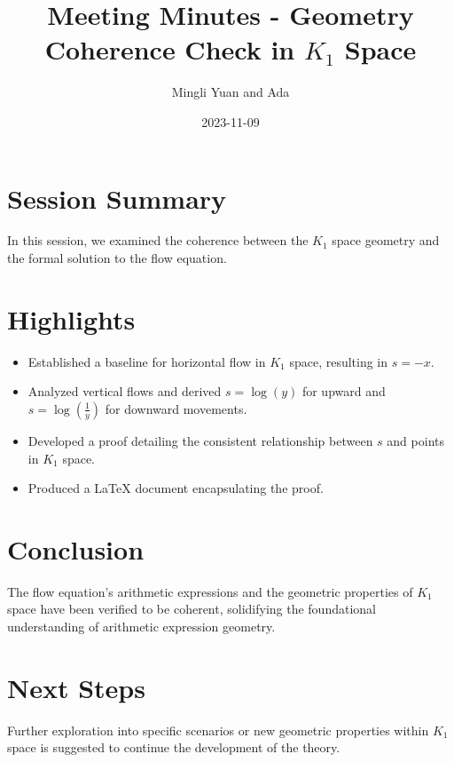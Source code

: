 \documentclass{article}
\title{Meeting Minutes - Geometry Coherence Check in \(K_1\) Space}
\author{Mingli Yuan and Ada}
\date{2023-11-09}
\begin{document}
\maketitle

\section*{Session Summary}
In this session, we examined the coherence between the \(K_1\) space geometry and the formal solution to the flow equation.

\section*{Highlights}
\begin{itemize}
    \item Established a baseline for horizontal flow in \(K_1\) space, resulting in \(s = -x\).
    \item Analyzed vertical flows and derived \(s = \log(y)\) for upward and \(s = \log\left(\frac{1}{y}\right)\) for downward movements.
    \item Developed a proof detailing the consistent relationship between \(s\) and points in \(K_1\) space.
    \item Produced a LaTeX document encapsulating the proof.
\end{itemize}

\section*{Conclusion}
The flow equation's arithmetic expressions and the geometric properties of \(K_1\) space have been verified to be coherent, solidifying the foundational understanding of arithmetic expression geometry.

\section*{Next Steps}
Further exploration into specific scenarios or new geometric properties within \(K_1\) space is suggested to continue the development of the theory.
\end{document}
